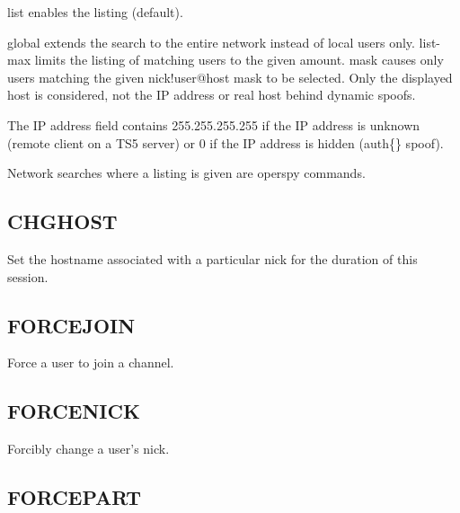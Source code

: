 	list enables the listing (default).

	global extends the search to the entire network instead of local users
	only. list-{}max limits the listing of matching users to the given
	amount.	mask causes only users matching the given nick!user@host mask
	to be selected. Only the displayed host is considered, not the
	IP address or real host behind dynamic spoofs.


	The IP address field contains 255.255.255.255 if the IP address
	is unknown (remote client on a TS5 server) or 0 if the IP address
	is hidden (auth\{\} spoof).


	Network searches where a listing is given are operspy commands.


\subsection{CHGHOST}

     

	Set the hostname associated with a particular nick for the duration of
	this session.


\subsection{FORCEJOIN}

     

           Force a user to join a channel.



\subsection{FORCENICK}

     

           Forcibly change a user's nick.



\subsection{FORCEPART}

     

